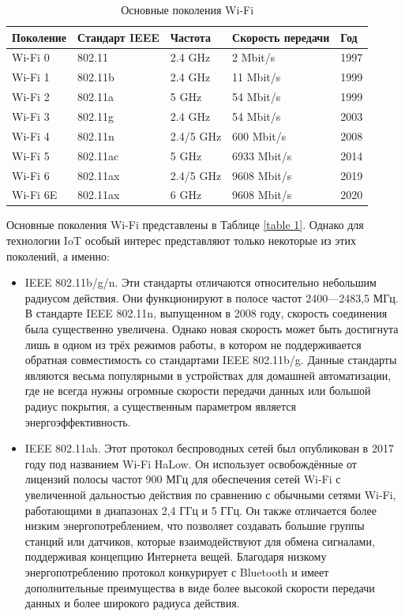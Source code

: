 	\begin{table}[h]
		\centering
		\begin{tabular}{ | l | l | l | l | l | }
			\hline
			Поколение & Стандарт IEEE & Частота & Скорость передачи & Год \\ \hline
			Wi-Fi 0 & 802.11 & 2.4 GHz & 2 Mbit/s & 1997 \\ \hline
			Wi-Fi 1 & 802.11b & 2.4 GHz & 11 Mbit/s & 1999 \\ \hline
			Wi-Fi 2 & 802.11a & 5 GHz & 54 Mbit/s & 1999 \\ \hline
			Wi-Fi 3 & 802.11g & 2.4 GHz & 54 Mbit/s & 2003 \\ \hline
			Wi-Fi 4 & 802.11n & 2.4/5 GHz & 600 Mbit/s & 2008 \\ \hline
			Wi-Fi 5 & 802.11ac & 5 GHz & 6933 Mbit/s & 2014 \\ \hline
			Wi-Fi 6 & 802.11ax & 2.4/5 GHz & 9608 Mbit/s & 2019 \\ \hline
			Wi-Fi 6E & 802.11ax & 6 GHz & 9608 Mbit/s & 2020 \\
			\hline
		\end{tabular}
		\caption{Основные поколения Wi-Fi}
		\label{table-wi-fi-generations}
	\end{table}
	
	Основные поколения Wi-Fi представлены в Таблице \ref{table 1}. Однако для технологии IoT особый интерес 
	представляют только некоторые из этих поколений, а именно:
	
	\begin{itemize}
		\item IEEE 802.11b/g/n. Эти стандарты отличаются относительно небольшим радиусом действия.
		Они функционируют в полосе частот 2400—2483,5 МГц. В стандарте  IEEE 802.11n, выпущенном
		в 2008 году, скорость соединения была существенно увеличена. Однако новая скорость может
		быть достигнута лишь в одном из трёх режимов работы, в котором не поддерживается обратная
		совместимость со стандартами IEEE 802.11b/g. Данные стандарты являются весьма популярными
		в устройствах для домашней автоматизации, где не всегда нужны огромные скорости передачи
		данных или большой радиус покрытия, а существенным параметром является энергоэффективность.
		\item IEEE 802.11ah. Этот протокол беспроводных сетей был опубликован в 2017 году под названием 
		Wi-Fi HaLow. Он использует освобождённые от лицензий полосы частот 900 МГц для обеспечения 
		сетей Wi-Fi с увеличенной дальностью действия по сравнению с обычными сетями Wi-Fi, работающими 
		в диапазонах 2,4 ГГц и 5 ГГц. Он также отличается более низким энергопотреблением, что позволяет 
		создавать большие группы станций или датчиков, которые взаимодействуют для обмена сигналами, 
		поддерживая концепцию Интернета вещей. Благодаря низкому энергопотреблению протокол конкурирует 
		с Bluetooth и имеет дополнительные преимущества в виде более высокой скорости передачи данных 
		и более широкого радиуса действия.
	\end{itemize}
	
